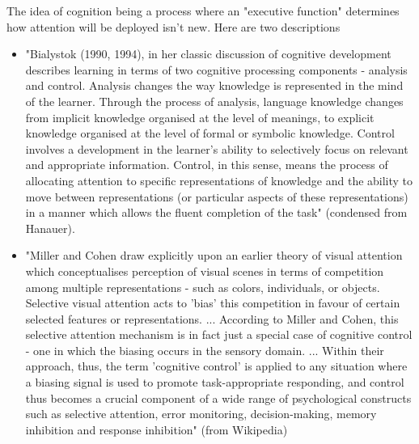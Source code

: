 \documentclass[11pt]{article}
\begin{document}
The idea of cognition being a process where an "executive function" determines how
attention will be deployed isn't new. Here are two descriptions
\begin{itemize}
\item 
"Bialystok (1990, 1994), in her classic discussion of
cognitive development describes learning in terms of two cognitive
processing components - analysis and control. Analysis changes the way knowledge
is represented in the mind of the learner. Through the process of analysis, language knowledge changes from implicit
knowledge organised at the level of meanings, to explicit knowledge
organised at the level of formal or symbolic knowledge. 
Control involves a development in the learner's ability to selectively
focus on relevant and appropriate information. Control, in this sense,
means the process of allocating attention to specific representations of
knowledge and the ability to move between representations (or particular
aspects of these representations) in a manner which allows the fluent
completion of the task" (condensed from Hanauer). 


\item 
"Miller and Cohen draw explicitly upon an earlier theory of visual attention
which conceptualises perception of visual scenes in terms of competition among
multiple representations - such as colors, individuals, or objects.
Selective visual attention acts to 'bias' this competition in favour of certain
selected features or representations. ... According to
Miller and Cohen, this selective attention mechanism is in fact just a special
case of cognitive control - one in which the biasing occurs in the sensory
domain. ... Within their approach, thus, the term 'cognitive control' is applied to
any situation where a biasing signal is used to promote task-appropriate
responding, and control thus becomes a crucial component of a wide range of
psychological constructs such as selective attention, error monitoring,
decision-making, memory inhibition and response inhibition" (from Wikipedia)

\end{itemize}
\end{document}
